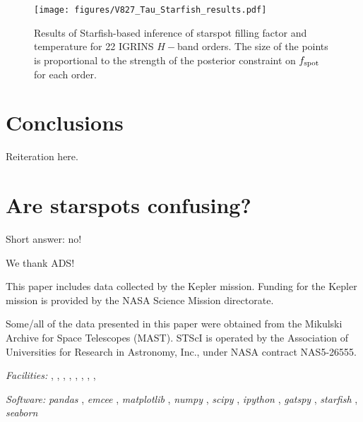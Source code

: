 \documentclass[twocolumn]{emulateapj}%
\newcommand{\project}[1]{\textsl{#1}}
\begin{document}
 \begin{figure*}
 \centering
 \texttt{[image: figures/V827\_Tau\_Starfish\_results.pdf]}
 \caption{Results of Starfish-based inference of starspot filling factor and temperature for 22 IGRINS $H-$band orders.  The size of the points is proportional to the strength of the posterior constraint on $f_{\rm spot}$ for each order.}
 \label{fig:V827TauStarfish}
\end{figure*}

\section{Conclusions}

Reiteration here.

\clearpage
\pagebreak


\appendix

\section{Are starspots confusing?}
\label{methods-details}

Short answer: no!

\acknowledgements

We thank ADS!

This paper includes data collected by the Kepler mission. Funding for the Kepler mission is provided by the NASA Science Mission directorate.

Some/all of the data presented in this paper were obtained from the Mikulski Archive for Space Telescopes (MAST). STScI is operated by the Association of Universities for Research in Astronomy, Inc., under NASA contract NAS5-26555.


{\it Facilities:} , , , , , , , , 

{\it Software: }
 \project{pandas} \citep{mckinney10},
 \project{emcee} \citep{foreman13},
 \project{matplotlib} \citep{hunter07},
 \project{numpy} \citep{vanderwalt11},
 \project{scipy} \citep{jones01},
 \project{ipython} \citep{perez07},
 \project{gatspy} \citep{JakeVanderplas2015},
 \project{starfish} \citep{czekala15},
 \project{seaborn} \citep{waskom14}

\clearpage



\end{document}
